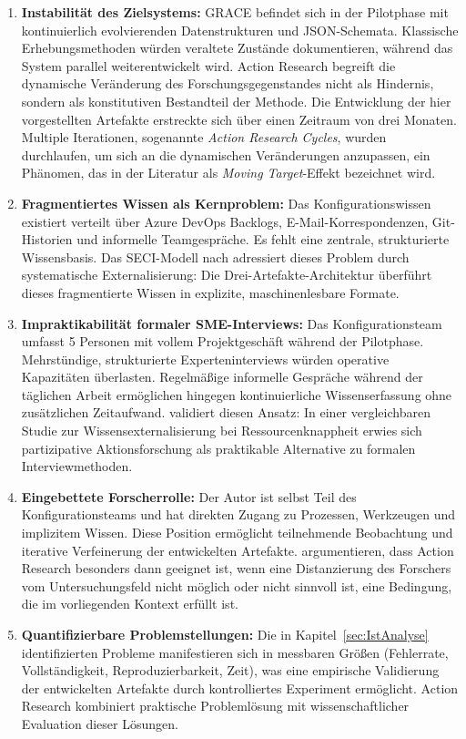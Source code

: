 \begin{enumerate}
    \item \textbf{Instabilität des Zielsystems:} GRACE befindet sich in der Pilotphase mit kontinuierlich evolvierenden Datenstrukturen und JSON-Schemata. Klassische Erhebungsmethoden würden veraltete Zustände dokumentieren, während das System parallel weiterentwickelt wird. Action Research begreift die dynamische Veränderung des Forschungsgegenstandes nicht als Hindernis, sondern als konstitutiven Bestandteil der Methode. Die Entwicklung der hier vorgestellten Artefakte erstreckte sich über einen Zeitraum von drei Monaten. Multiple Iterationen, sogenannte \textit{Action Research Cycles}, wurden durchlaufen, um sich an die dynamischen Veränderungen anzupassen, ein Phänomen, das in der Literatur als \textit{Moving Target}-Effekt bezeichnet wird.

    \item \textbf{Fragmentiertes Wissen als Kernproblem:} Das Konfigurationswissen existiert verteilt über Azure DevOps Backlogs, E-Mail-Korrespondenzen, Git-Historien und informelle Teamgespräche. Es fehlt eine zentrale, strukturierte Wissensbasis. Das SECI-Modell nach \cite{nonaka:knowledge_creating_company1995} adressiert dieses Problem durch systematische Externalisierung: Die Drei-Artefakte-Architektur überführt dieses fragmentierte Wissen in explizite, maschinenlesbare Formate.

    \item \textbf{Impraktikabilität formaler SME-Interviews:} Das Konfigurationsteam umfasst 5 Personen mit vollem Projektgeschäft während der Pilotphase. Mehrstündige, strukturierte Experteninterviews würden operative Kapazitäten überlasten. Regelmäßige informelle Gespräche während der täglichen Arbeit ermöglichen hingegen kontinuierliche Wissenserfassung ohne zusätzlichen Zeitaufwand. \cite{jackson:par2010} validiert diesen Ansatz: In einer vergleichbaren Studie zur Wissensexternalisierung bei Ressourcenknappheit erwies sich partizipative Aktionsforschung als praktikable Alternative zu formalen Interviewmethoden.

    \item \textbf{Eingebettete Forscherrolle:} Der Autor ist selbst Teil des Konfigurationsteams und hat direkten Zugang zu Prozessen, Werkzeugen und implizitem Wissen. Diese Position ermöglicht teilnehmende Beobachtung und iterative Verfeinerung der entwickelten Artefakte. \cite{susman:action_research1983} argumentieren, dass Action Research besonders dann geeignet ist, wenn eine Distanzierung des Forschers vom Untersuchungsfeld nicht möglich oder nicht sinnvoll ist, eine Bedingung, die im vorliegenden Kontext erfüllt ist.

    \item \textbf{Quantifizierbare Problemstellungen:} Die in Kapitel~\ref{sec:IstAnalyse} identifizierten Probleme manifestieren sich in messbaren Größen (Fehlerrate, Vollständigkeit, Reproduzierbarkeit, Zeit), was eine empirische Validierung der entwickelten Artefakte durch kontrolliertes Experiment ermöglicht. Action Research kombiniert praktische Problemlösung mit wissenschaftlicher Evaluation dieser Lösungen.
\end{enumerate}


